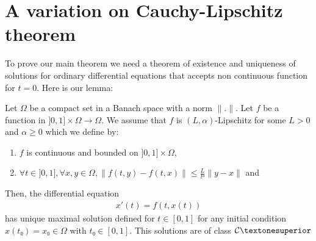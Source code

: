 \section{A variation on Cauchy-Lipschitz theorem}

To prove our main theorem we need a theorem of existence and uniqueness
of solutions for ordinary differential equations that accepts non continuous
function for $t=0$. Here is our lemma:

\begin{lemm}
  Let $Ω$ be a compact set in a Banach space with a norm $\|.\|$.  Let $f$ be a
  function in $]0,1] × Ω → Ω$. We assume that $f$ is $(L,α)$-Lipschitz for
  some $L > 0$ and $α ≥ 0$ which we define by:

  \begin{enumerate}
  \item $f$ is continuous and bounded on $]0,1] × Ω$,
  \item $∀t ∈ ]0,1], ∀x,y ∈ Ω, \|f(t,y) - f(t,x)\| ≤ \frac{L}{tᵅ} \|y - x\|$ and
  \end{enumerate}

  Then, the differential equation
  \begin{eqnarray}
    x'(t) = f(t,x(t)) \label{lipschitz-diffeq}
  \end{eqnarray}
  has unique maximal
  solution defined for $t ∈ [0,1]$ for any initial condition $x(t₀) = x₀ ∈ Ω$
  with $t₀ ∈ [0,1]$. This solutions are of class ${\cal C}¹$
\end{lemm}

